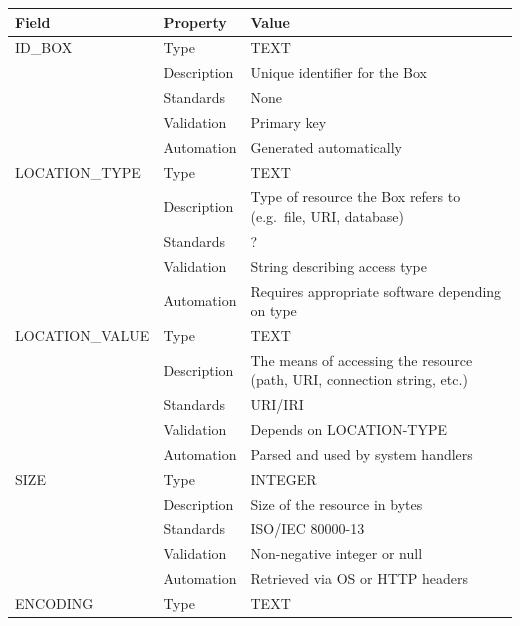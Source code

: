 \begin{longtable}[]{@{}
  >{\raggedright\arraybackslash}p{}
  >{\raggedright\arraybackslash}p{}
  >{\raggedright\arraybackslash}p{}@{}}
\toprule\noalign{}
\begin{minipage}[b]{\linewidth}\raggedright
Field
\end{minipage} & \begin{minipage}[b]{\linewidth}\raggedright
Property
\end{minipage} & \begin{minipage}[b]{\linewidth}\raggedright
Value
\end{minipage} \\
\midrule\noalign{}
\endhead
\bottomrule\noalign{}
\endlastfoot
ID\_BOX & Type & TEXT \\
& Description & Unique identifier for the Box \\
& Standards & None \\
& Validation & Primary key \\
& Automation & Generated automatically \\
LOCATION\_TYPE & Type & TEXT \\
& Description & Type of resource the Box refers to (e.g.~file, URI,
database) \\
& Standards & ? \\
& Validation & String describing access type \\
& Automation & Requires appropriate software depending on type \\
LOCATION\_VALUE & Type & TEXT \\
& Description & The means of accessing the resource (path, URI,
connection string, etc.) \\
& Standards & URI/IRI \\
& Validation & Depends on LOCATION-TYPE \\
& Automation & Parsed and used by system handlers \\
SIZE & Type & INTEGER \\
& Description & Size of the resource in bytes \\
& Standards & ISO/IEC 80000-13 \\
& Validation & Non-negative integer or null \\
& Automation & Retrieved via OS or HTTP headers \\
ENCODING & Type & TEXT \\

\end{longtable}
